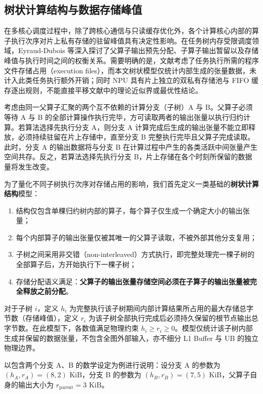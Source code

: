 \documentclass[anonymous,withtoc]{gmcm2026}
\providecommand{\tightlist}{\setlength{\itemsep}{0pt}\setlength{\parskip}{0pt}}
\begin{document}
\subsection{树状计算结构与数据存储峰值}

在多核心调度过程中，除了跨核心通信与只读缓存优化外，各个计算核心内部的算子执行次序对片上私有存储的驻留峰值具有决定性影响。在任务树内存受限调度领域，Eyraud-Dubois 等\cite{ref21}深入探讨了父算子输出预先分配、子算子输出暂留以及存储峰值与执行时间之间的权衡关系。需要明确的是，文献\cite{ref21}考虑了任务执行所需的程序文件存储占用（execution files），而本文树状模型仅统计内部生成的张量数据，未计入此类任务执行额外开销；同时 NPU 具有片上独立的双私有存储池与 FIFO 缓存逐出规则，不能直接平移文献\cite{ref21}中的理论近似界或最优性结论。

考虑由同一父算子汇聚的两个互不依赖的计算分支（子树）A 与 B。父算子必须等待 A 与 B 的全部计算操作执行完毕，方可读取两者的输出张量以执行归约计算。若算法选择先执行分支 A，则分支 A 计算完成后生成的输出张量不能立即释放，必须持续驻留在片上存储中，直至分支 B 完整执行完毕且父算子完成读取。此时，分支 A 的输出数据将与分支 B 在计算过程中产生的各类活跃中间张量产生空间共存。反之，若算法选择先执行分支 B，片上存储在各个时刻所保留的数据量将发生改变。

为了量化不同子树执行次序对存储占用的影响，我们首先定义一类基础的\textbf{树状计算结构}模型：

\begin{enumerate}
\def\labelenumi{\arabic{enumi}.}
\tightlist
\item
  结构仅包含单棵归约树内部的算子，每个算子仅生成一个确定大小的输出张量；
\item
  每个内部算子的输出张量仅被其唯一的父算子读取，不被外部其他分支复用；
\item
  子树之间采用非交错（non-interleaved）方式执行，即完整处理完一棵子树的全部算子后，方开始执行下一棵子树；
\item
  存储分配语义满足：\textbf{父算子的输出张量存储空间必须在子算子的输出张量被完全释放之前分配}。
\end{enumerate}

对于子树 \(i\)，定义 \(h_i\) 为完整执行该子树期间内部计算结果所占用的最大存储总字节数（存储峰值），定义 \(r_i\) 为该子树全部执行完成后必须持久保留的根节点输出总字节数。在此模型下，各数值满足物理约束 \(h_i \ge r_i \ge 0\)。模型仅统计该子树内部生成并保留的数据张量，不包含全图外部输入，亦不细分 L1 Buffer 与 UB 的独立物理边界。

以包含两个分支 A、B 的数学设定为例进行说明：设分支 A 的参数为 \((h_A, r_A) = (8, 2)\text{ KiB}\)，分支 B 的参数为 \((h_B, r_B) = (7, 5)\text{ KiB}\)，父算子自身的输出大小为 \(r_{\mathrm{parent}} = 3\text{ KiB}\)。
\end{document}
